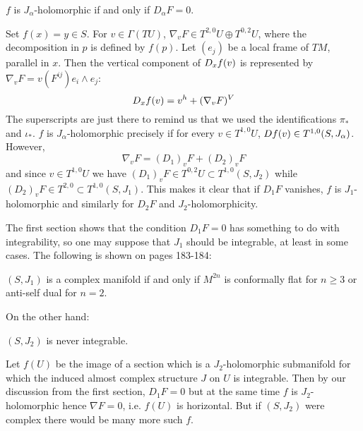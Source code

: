 \documentclass{scrartcl}
\begin{document}
\begin{prop}
	$f$ is $J_\alpha$-holomorphic if and only if $D_\alpha F=0$.
\end{prop}
\begin{myproof}
	Set $f(x)=y\in S$. For $v\in \Gamma(TU)$, $\nabla_v F\in T^{2,0}U\oplus T^{0,2}U$, where the decomposition in $p$ is defined by $f(p)$. Let $(e_j)$ be a local frame of $TM$, parallel in $x$. Then the vertical component of $D_x f(v)$ is represented by $\nabla_v F=v(F^{ij}) e_i\wedge e_j$:
	\begin{equation*}
	D_x f(v)=v^h+(\nabla_v F)^V
	\end{equation*}
	The superscripts are just there to remind us that we used the identifications $\pi_*$ and $\iota_*$. $f$ is $J_\alpha$-holomorphic precisely if for every $v\in T^{1,0}U$, $D f (v)\in T^{1,0}(S,J_\alpha)$. However, 
	\begin{equation*}
	\nabla_v F=(D_1)_v F+(D_2)_v F
	\end{equation*}
	and since $v\in T^{1,0}U$ we have $(D_1)_vF\in T^{0,2}U\subset T^{1,0}(S,J_2)$ while $(D_2)_vF\in T^{2,0}\subset T^{1,0}(S,J_1)$. This makes it clear that if $D_1 F$ vanishes, $f$ is $J_1$-holomorphic and similarly for $D_2 F$ and $J_2$-holomorphicity.
\end{myproof}

The first section shows that the condition $D_1 F=0$ has something to do with integrability, so one may suppose that $J_1$ should be integrable, at least in some cases. The following is shown on pages 183-184:

\begin{prop}
	$(S,J_1)$ is a complex manifold if and only if $M^{2n}$ is conformally flat for $n\geq 3$ or anti-self dual for $n=2$.
\end{prop}

On the other hand:

\begin{prop}
	$(S,J_2)$ is never integrable.
\end{prop}
\begin{myproof}
	Let $f(U)$ be the image of a section which is a $J_2$-holomorphic submanifold for which the induced almost complex structure $J$ on $U$ is integrable. Then by our discussion from the first section, $D_1 F=0$ but at the same time $f$ is $J_2$-holomorphic hence $\nabla F=0$, i.e. $f(U)$ is horizontal. But if $(S,J_2)$ were complex there would be many more such $f$.
\end{myproof}
\end{document}
